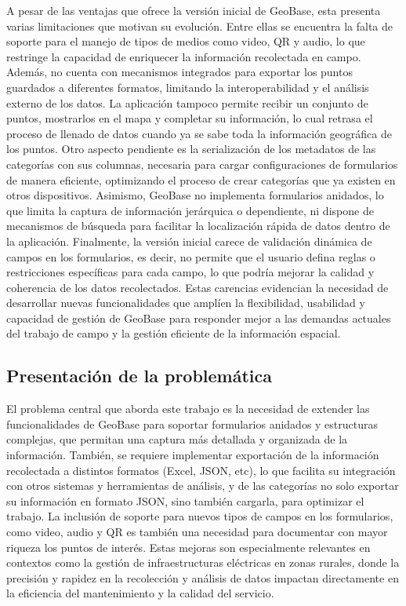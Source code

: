 \documentclass{article}
\begin{document}
A pesar de las ventajas que ofrece la versión inicial de GeoBase, esta presenta varias limitaciones que motivan su evolución. Entre ellas se encuentra la falta de soporte para el manejo de tipos de medios como video, QR y audio, lo que restringe la capacidad de enriquecer la información recolectada en campo. Además, no cuenta con mecanismos integrados para exportar los puntos guardados a diferentes formatos, limitando la interoperabilidad y el análisis externo de los datos. La aplicación tampoco permite recibir un conjunto de puntos, mostrarlos en el mapa y completar su información, lo cual retrasa el proceso de llenado de datos cuando ya se sabe toda la información geográfica de los puntos. Otro aspecto pendiente es la serialización de los metadatos de las categorías con sus columnas, necesaria para cargar configuraciones de formularios de manera eficiente, optimizando el proceso de crear categorías que ya existen en otros dispositivos. Asimismo, GeoBase no implementa formularios anidados, lo que limita la captura de información jerárquica o dependiente, ni dispone de mecanismos de búsqueda para facilitar la localización rápida de datos dentro de la aplicación. Finalmente, la versión inicial carece de validación dinámica de campos en los formularios, es decir, no permite que el usuario defina reglas o restricciones específicas para cada campo, lo que podría mejorar la calidad y coherencia de los datos recolectados. Estas carencias evidencian la necesidad de desarrollar nuevas funcionalidades que amplíen la flexibilidad, usabilidad y capacidad de gestión de GeoBase para responder mejor a las demandas actuales del trabajo de campo y la gestión eficiente de la información espacial.

\subsection{Presentación de la
problemática}\label{presentaciuxf3n-de-la-problemuxe1tica}

El problema central que aborda este trabajo es la necesidad de extender las funcionalidades de GeoBase para soportar formularios anidados y estructuras complejas, que permitan una captura más detallada y organizada de la información. También, se requiere implementar exportación de la información recolectada a distintos formatos (Excel, JSON, etc), lo que facilita su integración con otros sistemas y herramientas de análisis, y de las categorías no solo exportar su información en formato JSON, sino también cargarla, para optimizar el trabajo. La inclusión de soporte para nuevos tipos de campos en los formularios, como video, audio y QR es también una necesidad para documentar con mayor riqueza los puntos de interés. Estas mejoras son especialmente relevantes en contextos como la gestión de infraestructuras eléctricas en zonas rurales, donde la precisión y rapidez en la recolección y análisis de datos impactan directamente en la eficiencia del mantenimiento y la calidad del servicio.
\end{document}
